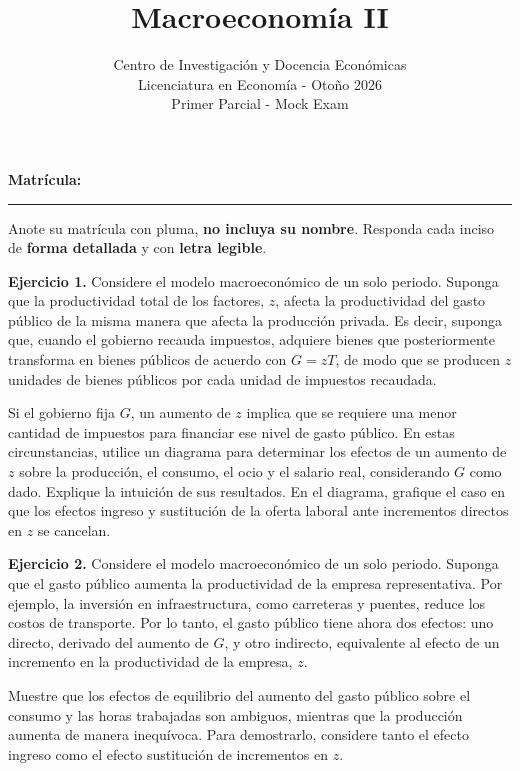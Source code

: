 \documentclass[12pt]{article}
\title{ \large Macroeconomía II \vspace{0.1cm}}
\author{Centro de Investigación y Docencia Económicas \\ \vspace{-0.05cm}
Licenciatura en Economía - Otoño 2026\\ \vspace{-0.05cm}
Primer Parcial - Mock Exam}
\date{}
\numberwithin{equation}{section}             %
\theoremstyle{definition}                    %
\theoremstyle{plain}                         %
\theoremstyle{remark} %
\theoremstyle{definition}
\begin{document}
\maketitle

\vspace{-.5cm}


\textbf{Matrícula:} \rule{15cm}{0.4pt}


\small Anote su matrícula con pluma, \textbf{no incluya su nombre}. 
Responda cada inciso de \textbf{forma detallada} y con \textbf{letra legible}. 
\vspace{.4cm}


\normalsize



\textbf{Ejercicio 1.} Considere el modelo macroeconómico de un solo periodo. Suponga que la productividad total de los factores, $z$, afecta la productividad del gasto público de la misma manera que afecta la producción privada. Es decir, suponga que, cuando el gobierno recauda impuestos, adquiere bienes que posteriormente transforma en bienes públicos de acuerdo con $G=zT$, de modo que se producen $z$ unidades de bienes públicos por cada unidad de impuestos recaudada.

Si el gobierno fija $G$, un aumento de $z$ implica que se requiere una menor cantidad de impuestos para financiar ese nivel de gasto público. En estas circunstancias, utilice un diagrama para determinar los efectos de un aumento de $z$ sobre la producción, el consumo, el ocio y el salario real, considerando $G$ como dado. Explique la intuición de sus resultados. En el diagrama, grafique el caso en que los efectos ingreso y sustitución de la oferta laboral ante incrementos directos en $z$ se cancelan.


\textbf{Ejercicio 2.} Considere el modelo macroeconómico de un solo periodo. Suponga que el gasto público aumenta la productividad de la empresa representativa. Por ejemplo, la inversión en infraestructura, como carreteras y puentes, reduce los costos de transporte. Por lo tanto, el gasto público tiene ahora dos efectos: uno directo, derivado del aumento de $G$, y otro indirecto, equivalente al efecto de un incremento en la productividad de la empresa, $z$. 

Muestre que los efectos de equilibrio del aumento del gasto público sobre el consumo y las horas trabajadas son ambiguos, mientras que la producción aumenta de manera inequívoca. Para demostrarlo, considere tanto el efecto ingreso como el efecto sustitución de incrementos en $z$.
\end{document}
